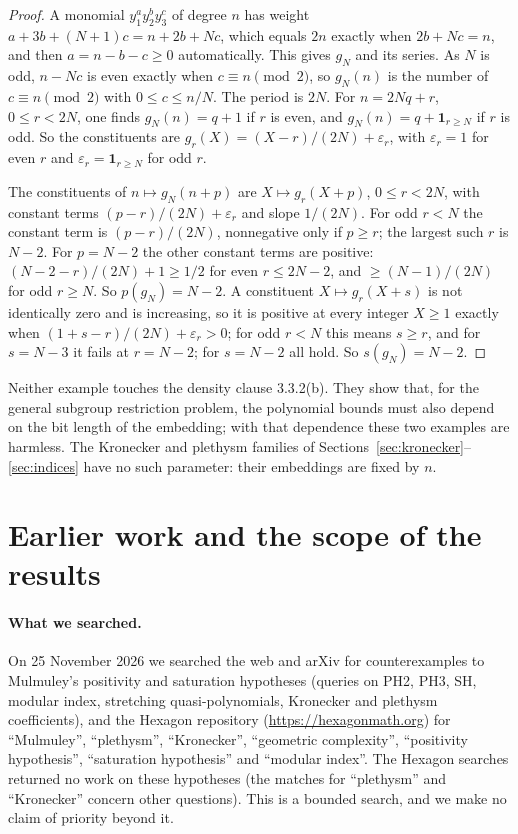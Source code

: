 \documentclass[11pt,a4paper]{article}
\theoremstyle{definition}
\begin{document}
\begin{proof}
A monomial $y_1^ay_2^by_3^c$ of degree $n$ has weight $a+3b+(N+1)c=n+2b+Nc$,
which equals $2n$ exactly when $2b+Nc=n$, and then $a=n-b-c\ge0$ automatically.
This gives $g_N$ and its series. As $N$ is odd, $n-Nc$ is even exactly when
$c\equiv n\pmod2$, so $g_N(n)$ is the number of $c\equiv n\pmod2$ with
$0\le c\le n/N$. The period is $2N$. For $n=2Nq+r$, $0\le r<2N$, one finds
$g_N(n)=q+1$ if $r$ is even, and $g_N(n)=q+\mathbf1_{r\ge N}$ if $r$ is odd. So
the constituents are $g_r(X)=(X-r)/(2N)+\varepsilon_r$, with $\varepsilon_r=1$
for even $r$ and $\varepsilon_r=\mathbf1_{r\ge N}$ for odd $r$.

The constituents of $n\mapsto g_N(n+p)$ are $X\mapsto g_r(X+p)$, $0\le r<2N$,
with constant terms $(p-r)/(2N)+\varepsilon_r$ and slope $1/(2N)$. For odd
$r<N$ the constant term is $(p-r)/(2N)$, nonnegative only if $p\ge r$; the
largest such $r$ is $N-2$. For $p=N-2$ the other constant terms are positive:
$(N-2-r)/(2N)+1\ge1/2$ for even $r\le2N-2$, and $\ge(N-1)/(2N)$ for odd
$r\ge N$. So $p(g_N)=N-2$. A constituent $X\mapsto g_r(X+s)$ is not
identically zero and is increasing, so it is positive at every integer $X\ge1$
exactly when $(1+s-r)/(2N)+\varepsilon_r>0$; for odd $r<N$ this means $s\ge r$,
and for $s=N-3$ it fails at $r=N-2$; for $s=N-2$ all hold. So $s(g_N)=N-2$.
\end{proof}

Neither example touches the density clause 3.3.2(b). They show that, for the
general subgroup restriction problem, the polynomial bounds must also depend on
the bit length of the embedding; with that dependence these two examples are
harmless. The Kronecker and plethysm families of
Sections~\ref{sec:kronecker}--\ref{sec:indices} have no such parameter: their
embeddings are fixed by $n$.

\section{Earlier work and the scope of the results}\label{sec:literature}

\paragraph{What we searched.}
On 25 November 2026 we searched the web and arXiv for counterexamples to
Mulmuley's positivity and saturation hypotheses (queries on PH2, PH3, SH,
modular index, stretching quasi-polynomials, Kronecker and plethysm
coefficients), and the Hexagon repository (\url{https://hexagonmath.org}) for
``Mulmuley'', ``plethysm'', ``Kronecker'', ``geometric complexity'',
``positivity hypothesis'', ``saturation hypothesis'' and ``modular index''. The
Hexagon searches returned no work on these hypotheses (the matches for
``plethysm'' and ``Kronecker'' concern other questions). This is a bounded
search, and we make no claim of priority beyond it.
\end{document}
